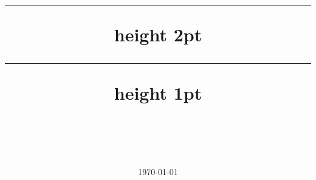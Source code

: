 \pagestyle{fancy}
\fancyhead[L]{\lheader}
\fancyhead[R]{\rheader}
\fancyfoot[C]{\thepage}
\title{
    \sffamily
    \vspace{-2cm}
    \hrule  height 2pt \relax
    \vspace{.5cm}
    {
    \heiti{\huge \mytitle}\\
    \mysubtitle
    }
    \vspace{.5cm}
    \hrule height 1pt \relax
    }
\author{\name\\
    \sno\\
    \institution\\
    \color{DarkRed}
    \href{mailto:\email}{\selectfont\email}
    }
\date{\today}
